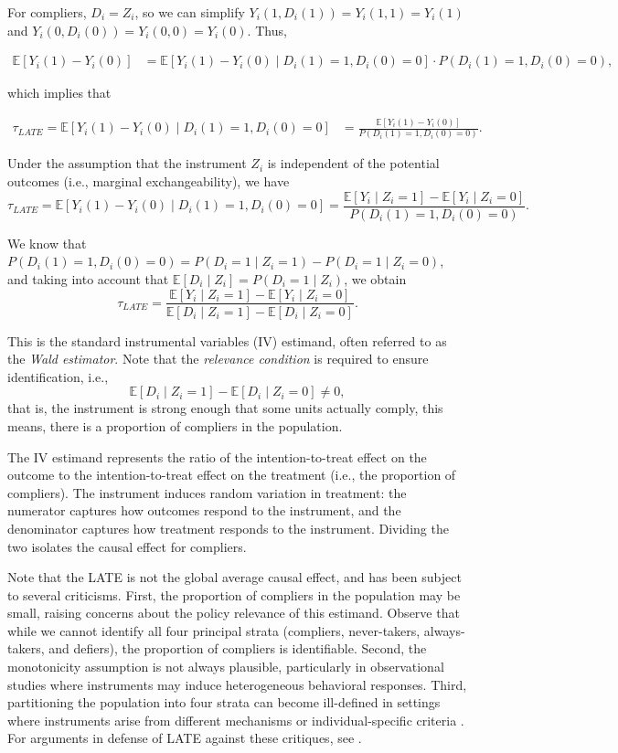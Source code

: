 For compliers, $D_i = Z_i$, so we can simplify $Y_i(1,D_i(1)) = Y_i(1,1) = Y_i(1)$ and $Y_i(0,D_i(0)) = Y_i(0,0) = Y_i(0)$. Thus,

\begin{align*}
	\mathbb{E}[Y_i(1) - Y_i(0)] 
	&= \mathbb{E}[Y_i(1) - Y_i(0) \mid D_i(1) = 1, D_i(0) = 0] \cdot P(D_i(1) = 1, D_i(0) = 0),
\end{align*}

which implies that

\begin{align*}
	\tau_{LATE} = \mathbb{E}[Y_i(1) - Y_i(0) \mid D_i(1) = 1, D_i(0) = 0] 
	&= \frac{\mathbb{E}[Y_i(1) - Y_i(0)]}{P(D_i(1) = 1, D_i(0) = 0)}.
\end{align*}

Under the assumption that the instrument \( Z_i \) is independent of the potential outcomes (i.e., marginal exchangeability), we have
\[
\tau_{LATE} = \mathbb{E}[Y_i(1) - Y_i(0) \mid D_i(1) = 1, D_i(0) = 0] 
= \frac{\mathbb{E}[Y_i \mid Z_i = 1] - \mathbb{E}[Y_i \mid Z_i = 0]}{P(D_i(1) = 1, D_i(0) = 0)}.
\]

We know that $P(D_i(1) = 1, D_i(0) = 0)=P(D_i = 1 \mid Z_i = 1) - P(D_i = 1 \mid Z_i = 0)$, and taking into account that \( \mathbb{E}[D_i \mid Z_i] = P(D_i = 1 \mid Z_i) \), we obtain
\[
\tau_{LATE} = \frac{\mathbb{E}[Y_i \mid Z_i = 1] - \mathbb{E}[Y_i \mid Z_i = 0]}{\mathbb{E}[D_i \mid Z_i = 1] - \mathbb{E}[D_i \mid Z_i = 0]}.
\]

This is the standard instrumental variables (IV) estimand, often referred to as the \textit{Wald estimator}. Note that the \textit{relevance condition} is required to ensure identification, i.e.,
\[
\mathbb{E}[D_i \mid Z_i = 1] - \mathbb{E}[D_i \mid Z_i = 0] \neq 0,
\]
that is, the instrument is strong enough that some units actually comply, this means, there is a proportion of compliers in the population.

The IV estimand represents the ratio of the intention-to-treat effect on the outcome to the intention-to-treat effect on the treatment (i.e., the proportion of compliers). The instrument induces random variation in treatment: the numerator captures how outcomes respond to the instrument, and the denominator captures how treatment responds to the instrument. Dividing the two isolates the causal effect for compliers.

Note that the LATE is not the global average causal effect, and has been subject to several criticisms. First, the proportion of compliers in the population may be small, raising concerns about the policy relevance of this estimand. Observe that while we cannot identify all four principal strata (compliers, never-takers, always-takers, and defiers), the proportion of compliers is identifiable. Second, the monotonicity assumption is not always plausible, particularly in observational studies where instruments may induce heterogeneous behavioral responses. Third, partitioning the population into four strata can become ill-defined in settings where instruments arise from different mechanisms or individual-specific criteria \cite{deaton2010instruments,hernan2020causal}. For arguments in defense of LATE against these critiques, see \cite{angrist2010better}.\\

